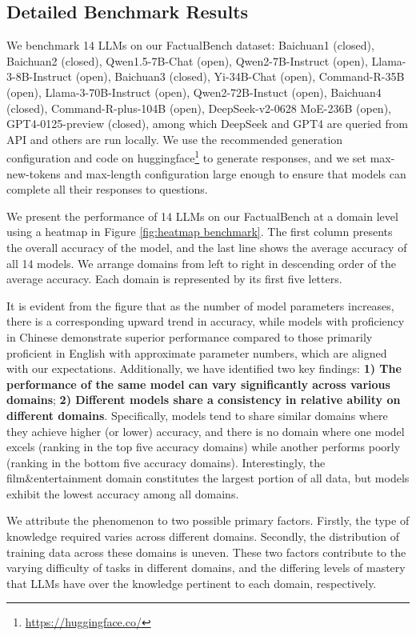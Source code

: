\subsection{Detailed Benchmark Results}
\label{cha:detailed result}
We benchmark 14 LLMs on our FactualBench dataset: Baichuan1 (closed), Baichuan2 (closed), Qwen1.5-7B-Chat (open), Qwen2-7B-Instruct (open), Llama-3-8B-Instruct (open), Baichuan3 (closed), Yi-34B-Chat (open), Command-R-35B (open), Llama-3-70B-Instruct (open), Qwen2-72B-Instuct (open), Baichuan4 (closed), Command-R-plus-104B (open), DeepSeek-v2-0628 MoE-236B (open), GPT4-0125-preview (closed), among which DeepSeek and GPT4 are queried from API and others are run locally. We use the recommended generation configuration and code on huggingface\footnote{\url{https://huggingface.co/}} to generate responses, and we set max-new-tokens and max-length configuration large enough to ensure that models can complete all their responses to questions.

We present the performance of 14 LLMs on our FactualBench at a domain level using a heatmap in Figure \ref{fig:heatmap benchmark}. The first column presents the overall accuracy of the model, and the last line shows the average accuracy of all 14 models. We arrange domains from left to right in descending order of the average accuracy. Each domain is represented by its first five letters.

It is evident from the figure that as the number of model parameters increases, there is a corresponding upward trend in accuracy, while models with proficiency in Chinese demonstrate superior performance compared to those primarily proficient in English with approximate parameter numbers, which are aligned with our expectations. Additionally, we have identified two key findings: 
\textbf{1) The performance of the same model can vary significantly across various domains}; 
\textbf{2) Different models share a consistency in relative ability on different domains}. Specifically, models tend to share similar domains where they achieve higher (or lower) accuracy, and there is no domain where one model excels (ranking in the top five accuracy domains) while another performs poorly (ranking in the bottom five accuracy domains). Interestingly, the film\&entertainment domain constitutes the largest portion of all data, but models exhibit the lowest accuracy among all domains.

We attribute the phenomenon to two possible primary factors. Firstly, the type of knowledge required varies across different domains. Secondly, the distribution of training data across these domains is uneven. These two factors contribute to the varying difficulty of tasks in different domains, and the differing levels of mastery that LLMs have over the knowledge pertinent to each domain, respectively.

